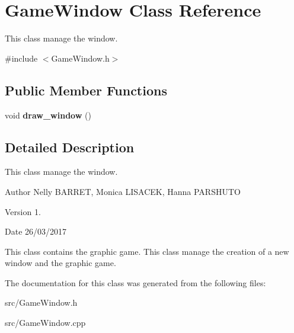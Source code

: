 \hypertarget{classGameWindow}{}\section{Game\+Window Class Reference}
\label{classGameWindow}


This class manage the window.  




{\ttfamily \#include $<$Game\+Window.\+h$>$}

\subsection*{Public Member Functions}
\begin{DoxyCompactItemize}
\item 
void {\bfseries draw\+\_\+window} ()\hypertarget{classGameWindow_a1be477ef9848d904b45720136c98e240}{}\label{classGameWindow_a1be477ef9848d904b45720136c98e240}

\end{DoxyCompactItemize}


\subsection{Detailed Description}
This class manage the window. 

\begin{DoxyAuthor}{Author}
Nelly B\+A\+R\+R\+ET, Monica L\+I\+S\+A\+C\+EK, Hanna P\+A\+R\+S\+H\+U\+TO 
\end{DoxyAuthor}
\begin{DoxyVersion}{Version}
1. 
\end{DoxyVersion}
\begin{DoxyDate}{Date}
26/03/2017
\end{DoxyDate}
This class contains the graphic game. This class manage the creation of a new window and the graphic game. 

The documentation for this class was generated from the following files\+:\begin{DoxyCompactItemize}
\item 
src/Game\+Window.\+h\item 
src/Game\+Window.\+cpp\end{DoxyCompactItemize}
